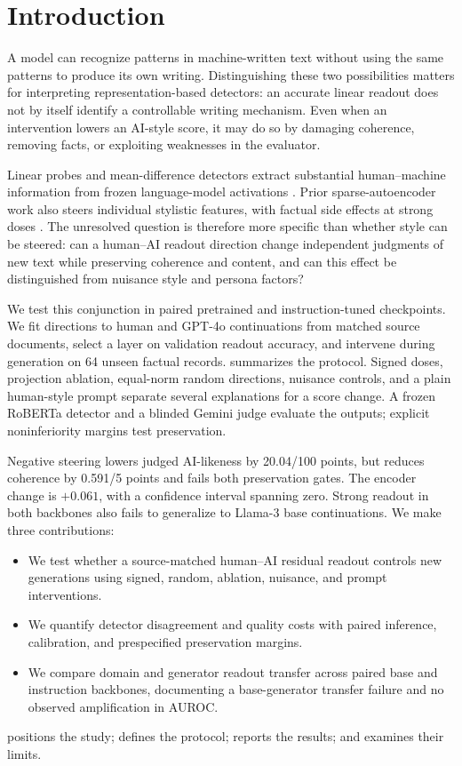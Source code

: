 \section{Introduction}\label{sec:intro}
A model can recognize patterns in machine-written text without using the same patterns to produce its own writing. Distinguishing these two possibilities matters for interpreting representation-based detectors: an accurate linear readout does not by itself identify a controllable writing mechanism. Even when an intervention lowers an AI-style score, it may do so by damaging coherence, removing facts, or exploiting weaknesses in the evaluator.

Linear probes and mean-difference detectors extract substantial human--machine information from frozen language-model activations \cite{quaremba2026,vishnyakov2026}. Prior sparse-autoencoder work also steers individual stylistic features, with factual side effects at strong doses \cite{kuznetsov2025}. The unresolved question is therefore more specific than whether style can be steered: can a human--AI readout direction change independent judgments of new text while preserving coherence and content, and can this effect be distinguished from nuisance style and persona factors?

We test this conjunction in paired pretrained and instruction-tuned \qwen checkpoints. We fit directions to human and GPT-4o continuations from matched source documents, select a layer on validation readout accuracy, and intervene during generation on 64 unseen factual records.  summarizes the protocol. Signed doses, projection ablation, equal-norm random directions, nuisance controls, and a plain human-style prompt separate several explanations for a score change. A frozen RoBERTa detector and a blinded Gemini judge evaluate the outputs; explicit noninferiority margins test preservation.

Negative steering lowers judged AI-likeness by 20.04/100 points, but reduces coherence by 0.591/5 points and fails both preservation gates. The encoder change is $+0.061$, with a confidence interval spanning zero. Strong readout in both backbones also fails to generalize to Llama-3 base continuations. We make three contributions:
\begin{itemize}[leftmargin=*,itemsep=0pt,topsep=0pt]
\item We test whether a source-matched human--AI residual readout controls new generations using signed, random, ablation, nuisance, and prompt interventions.
\item We quantify detector disagreement and quality costs with paired inference, calibration, and prespecified preservation margins.
\item We compare domain and generator readout transfer across paired base and instruction backbones, documenting a base-generator transfer failure and no observed amplification in AUROC.
\end{itemize}
 positions the study;  defines the protocol;  reports the results; and  examines their limits.

